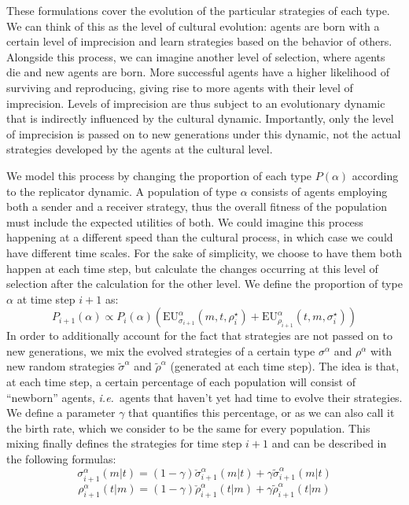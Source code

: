 \documentclass[a4paper]{article}
\begin{document}
These formulations cover the evolution of the particular strategies of each type.
We can think of this as the level of cultural evolution: agents are born with a certain level of imprecision and learn strategies based on the behavior of others.
Alongside this process, we can imagine another level of selection, where agents die and new agents are born.
More successful agents have a higher likelihood of surviving and reproducing, giving rise to more agents with their level of imprecision.
Levels of imprecision are thus subject to an evolutionary dynamic that is indirectly influenced by the cultural dynamic.
Importantly, only the level of imprecision is passed on to new generations under this dynamic, not the actual strategies developed by the agents at the cultural level.

We model this process by changing the proportion of each type $P(\alpha)$ according to the replicator dynamic.
A population of type $\alpha$ consists of agents employing both a sender and a receiver strategy, thus the overall fitness of the population must include the expected utilities of both.
We could imagine this process happening at a different speed than the cultural process, in which case we could have different time scales.
For the sake of simplicity, we choose to have them both happen at each time step, but calculate the changes occurring at this level of selection after the calculation for the other level.
We define the proportion of type $\alpha$ at time step $i+1$ as:
$$
P_{i+1}(\alpha) \propto P_i(\alpha)(\text{EU}_{\sigma_{i+1}}^{\alpha}(m,t,\rho_{i}^{\star}) + \text{EU}_{\rho_{i+1}}^{\alpha}(t,m,\sigma_{i}^{\star}))
$$
In order to additionally account for the fact that strategies are not passed on to new generations, we mix the evolved strategies of a certain type $\sigma^\alpha$ and $\rho^\alpha$ with new random strategies $\tilde{\sigma}^\alpha$ and $\tilde{\rho}^\alpha$ (generated at each time step).
The idea is that, at each time step, a certain percentage of each population will consist of ``newborn'' agents, \emph{i.e.}~agents that haven't yet had time to evolve their strategies.
We define a parameter $\gamma$ that quantifies this percentage, or as we can also call it the birth rate, which we consider to be the same for every population.
This mixing finally defines the strategies for time step $i+1$ and can be described in the following formulas:
$$
\sigma_{i+1}^{\alpha}(m|t)=(1 - \gamma)\check{\sigma}_{i+1}^{\alpha}(m|t) + \gamma \tilde{\sigma}_{i+1}^{\alpha}(m|t)
$$
$$
\rho_{i+1}^{\alpha}(t|m)=(1 - \gamma)\check{\rho}_{i+1}^{\alpha}(t|m) + \gamma \tilde{\rho}_{i+1}^{\alpha}(t|m)
$$
\end{document}
